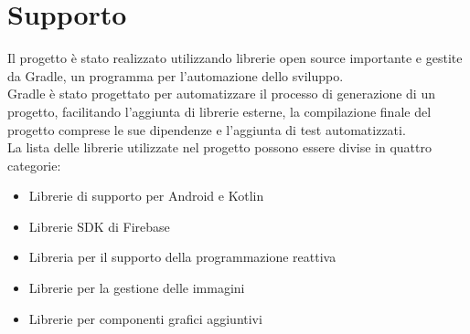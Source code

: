 \section{Supporto}
Il progetto è stato realizzato utilizzando librerie open source importante e gestite da Gradle, un programma per l'automazione dello sviluppo.\\
Gradle è stato progettato per automatizzare il processo di generazione di un progetto, facilitando l'aggiunta di librerie esterne, la compilazione finale del progetto comprese le sue dipendenze e l'aggiunta di test automatizzati.\\
La lista delle librerie utilizzate nel progetto possono essere divise in quattro categorie:
\begin{itemize}
    \item Librerie di supporto per Android e Kotlin
    \item Librerie SDK di Firebase
    \item Libreria per il supporto della programmazione reattiva
    \item Librerie per la gestione delle immagini
    \item Librerie per componenti grafici aggiuntivi
\end{itemize}

\newpage
